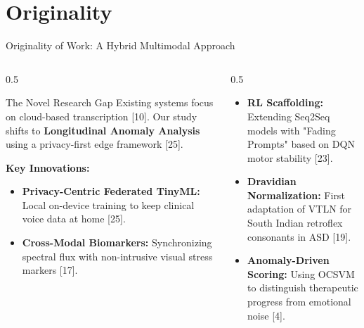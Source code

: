 \documentclass[aspectratio=169, 11pt]{beamer}
\begin{document}
\section{Originality}
\begin{frame}{ Originality of Work: A Hybrid Multimodal Approach}
    \begin{columns}
        \begin{column}{0.5\textwidth}
            \begin{block}{The Novel Research Gap}
                Existing systems focus on cloud-based transcription [10]. Our study shifts to \textbf{Longitudinal Anomaly Analysis} using a privacy-first edge framework [25].
            \end{block}
            \textbf{Key Innovations:}
            \begin{itemize}
                \item \textbf{Privacy-Centric Federated TinyML:} Local on-device training to keep clinical voice data at home [25].
                \item \textbf{Cross-Modal Biomarkers:} Synchronizing spectral flux with non-intrusive visual stress markers [17].
            \end{itemize}
        \end{column}
        \begin{column}{0.5\textwidth}
            \begin{itemize}
                \item \textbf{RL Scaffolding:} Extending Seq2Seq models with "Fading Prompts" based on DQN motor stability [23].
                \item \textbf{Dravidian Normalization:} First adaptation of VTLN for South Indian retroflex consonants in ASD [19].
                \item \textbf{Anomaly-Driven Scoring:} Using OCSVM to distinguish therapeutic progress from emotional noise [4].
            \end{itemize}
        \end{column}
    \end{columns}
\end{frame}


\end{document}
